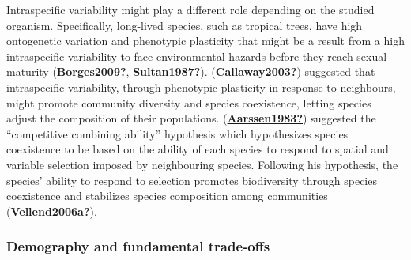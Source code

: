 \documentclass[12pt,twoside,a4paper, a]{article}
\begin{document}
Intraspecific variability might play a different role depending on the studied organism.
Specifically, long-lived species, such as tropical trees, have high ontogenetic variation and phenotypic plasticity that might be a result from a high intraspecific variability to face environmental hazards before they reach sexual maturity (\protect\hyperlink{ref-Borges2009}{\textbf{Borges2009?}}, \protect\hyperlink{ref-Sultan1987}{\textbf{Sultan1987?}}).
(\protect\hyperlink{ref-Callaway2003}{\textbf{Callaway2003?}}) suggested that intraspecific variability, through phenotypic plasticity in response to neighbours, might promote community diversity and species coexistence, letting species adjust the composition of their populations.
(\protect\hyperlink{ref-Aarssen1983}{\textbf{Aarssen1983?}}) suggested the ``competitive combining ability'' hypothesis which hypothesizes species coexistence to be based on the ability of each species to respond to spatial and variable selection imposed by neighbouring species.
Following his hypothesis, the species' ability to respond to selection promotes biodiversity through species coexistence and stabilizes species composition among communities (\protect\hyperlink{ref-Vellend2006a}{\textbf{Vellend2006a?}}).

\hypertarget{demography-and-fundamental-trade-offs}{%
\subsubsection{Demography and fundamental trade-offs}\label{demography-and-fundamental-trade-offs}}
\end{document}
